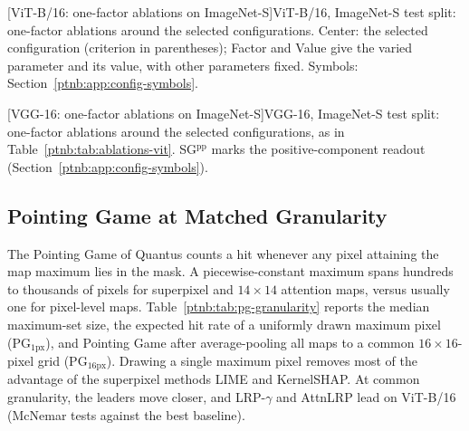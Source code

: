 \begin{center}
    \captionsetup{hypcap=false}
    [ViT-B/16: one-factor ablations on ImageNet-S]{ViT-B/16, ImageNet-S test split: one-factor ablations around the selected
    configurations. Center: the selected configuration (criterion in parentheses); Factor and Value give the varied parameter and its value, with other parameters fixed. Symbols: Section~\ref{ptnb:app:config-symbols}.}
    \label{ptnb:tab:ablations-vit}
\end{center}
\captionsetup{hypcap=true}
{\small{}}

\begin{center}
    \captionsetup{hypcap=false}
    [VGG-16: one-factor ablations on ImageNet-S]{VGG-16, ImageNet-S test split: one-factor ablations around the selected
    configurations, as in Table~\ref{ptnb:tab:ablations-vit}. SG$^{\mathrm{pp}}$ marks the positive-component readout (Section~\ref{ptnb:app:config-symbols}).}
    \label{ptnb:tab:ablations-vgg}
\end{center}
\captionsetup{hypcap=true}
{\small{}}

\subsection{Pointing Game at Matched Granularity}\label{ptnb:app:pg-granularity}

The Pointing Game of Quantus counts a hit whenever any pixel attaining the map maximum lies in the mask. A piecewise-constant maximum spans hundreds to thousands of pixels for superpixel and $14{\times}14$ attention maps, versus usually one for pixel-level maps. Table~\ref{ptnb:tab:pg-granularity} reports the median maximum-set size, the expected hit rate of a uniformly drawn maximum pixel (PG$_{1\mathrm{px}}$), and Pointing Game after average-pooling all maps to a common $16{\times}16$-pixel grid (PG$_{16\mathrm{px}}$). Drawing a single maximum pixel removes most of the advantage of the superpixel methods LIME and KernelSHAP. At common granularity, the leaders move closer, and LRP-$\gamma$ and AttnLRP lead on ViT-B/16 (McNemar tests against the best baseline).

\begin{table}[htbp]
    \centering
    \caption[Pointing Game: Quantus tie rule and matched granularity]{Pointing Game under the Quantus tie rule (PG, as in the main tables) and at matched
    granularity, ViT-B/16 on the ImageNet-S test split. max.\ set: median number of pixels attaining the map maximum;
    PG$_{1\mathrm{px}}$: expected hit rate of one pixel drawn uniformly from that set;
    PG$_{16\mathrm{px}}$: PG after average-pooling the map to $16{\times}16$-pixel cells. Rows: the
    \texttt{loc}-selected or fixed configuration of every method, plus the \texttt{faith} rows of our
    games. \textbf{Bold}: best per column. Variant markers: Section~\ref{ptnb:app:config-symbols}.}
    \label{ptnb:tab:pg-granularity}
%
\end{table}
